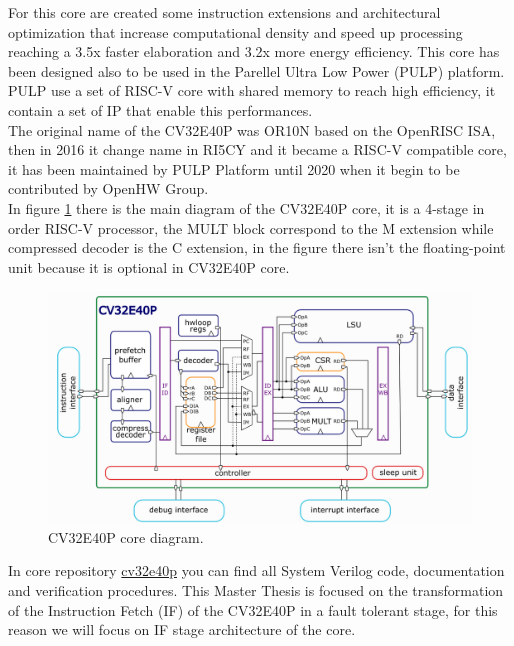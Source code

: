{{		
		For this core are created some instruction extensions and architectural optimization that increase computational density and speed up processing reaching a 3.5x faster elaboration and 3.2x more energy efficiency. 
		This core has been designed also to be used in the Parellel Ultra Low Power (PULP) platform. PULP use a set of RISC-V core with shared memory to reach high efficiency, it contain a set of IP that enable this performances.\\
		
		
		The original name of the CV32E40P was OR10N based on the OpenRISC ISA, then in 2016 it change name in RI5CY and it became a RISC-V compatible core, it has been maintained by PULP Platform until 2020 when it begin to be contributed by OpenHW Group.\\
		
		In figure \ref{fig:cv32e40p_core_diagram} there is the main diagram of the CV32E40P core, it is a 4-stage in order RISC-V processor, the MULT block correspond to the M extension while compressed decoder is the C extension, in the figure there isn't the floating-point unit because it is optional in CV32E40P core.
		
	    \begin{figure}[H]
			\centering
			\includegraphics[scale=0.35,center]{./images/CV32E40P_core_diagram.png}
			\caption{CV32E40P core diagram.}
			\label{fig:cv32e40p_core_diagram}
		\end{figure}  
		
		In core repository \href{https://github.com/openhwgroup/cv32e40p}{cv32e40p} you can find all System Verilog code, documentation and verification procedures.
		This Master Thesis is focused on the transformation of the Instruction Fetch (IF) of the CV32E40P in a fault tolerant stage, for this reason we will focus on IF stage architecture of the core.
		
}}
